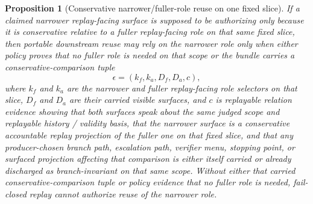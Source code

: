 \documentclass[11pt]{article}
\newtheorem{proposition}{Proposition}
\begin{document}
\begin{proposition}[Conservative narrower/fuller-role reuse on one fixed slice]
If a claimed narrower replay-facing surface is supposed to be authorizing only because it is conservative relative to a fuller replay-facing role on that same fixed slice, then portable downstream reuse may rely on the narrower role only when either policy proves that no fuller role is needed on that scope or the bundle carries a conservative-comparison tuple
\[
\epsilon=(k_f,k_a,D_f,D_a,c),
\]
where $k_f$ and $k_a$ are the narrower and fuller replay-facing role selectors on that slice, $D_f$ and $D_a$ are their carried visible surfaces, and $c$ is replayable relation evidence showing that both surfaces speak about the same judged scope and replayable history / validity basis, that the narrower surface is a conservative accountable replay projection of the fuller one on that fixed slice, and that any producer-chosen branch path, escalation path, verifier menu, stopping point, or surfaced projection affecting that comparison is either itself carried or already discharged as branch-invariant on that same scope.
Without either that carried conservative-comparison tuple or policy evidence that no fuller role is needed, fail-closed replay cannot authorize reuse of the narrower role.
\end{proposition}
\end{document}
